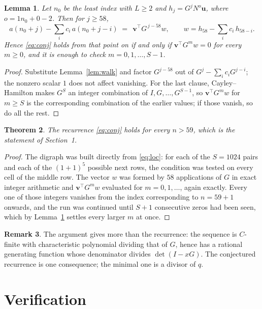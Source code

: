 \documentclass[11pt,a4paper]{article}
\theoremstyle{plain}
\newtheorem{theorem}{Theorem}
\newtheorem{lemma}[theorem]{Lemma}
\theoremstyle{definition}
\newtheorem{remark}[theorem]{Remark}
\begin{document}
\begin{lemma}\label{lem:crit}
Let $n_0$ be the least index with $L\ge2$ and $h_j=G^{j}N^{o}\mathbf{u}$, where
$o=1n_0+0-2$. Then for $j\ge58$,
\[
a(n_0+j)-\sum_i c_i\,a(n_0+j-i)\;=\;\,\mathbf{v}^{\!\top}G^{\,j-58}w,
\qquad w=h_{58}-\sum_i c_i\,h_{58-i} .
\]
Hence \eqref{eq:conj} holds from that point on if and only if
$\mathbf{v}^{\!\top}G^{m}w=0$ for every $m\ge0$, and it is enough to check
$m=0,1,\dots,S-1$.
\end{lemma}

\begin{proof}
Substitute Lemma~\ref{lem:walk} and factor $G^{j-58}$ out of
$G^{j}-\sum_ic_iG^{j-i}$; the nonzero scalar $1$ does not affect
vanishing. For the last clause, Cayley--Hamilton makes $G^{S}$ an integer combination of
$I,G,\dots,G^{S-1}$, so $\mathbf{v}^{\!\top}G^{m}w$ for $m\ge S$ is the corresponding
combination of the earlier values; if those vanish, so do all the rest.
\end{proof}

\begin{theorem}
The recurrence \eqref{eq:conj} holds for every $n>59$, which is the statement of
Section~1.
\end{theorem}

\begin{proof}
The digraph was built directly from \eqref{eq:loc}: for each of the $S=1024$ pairs and each
of the $(1+1)^{5}$ possible next rows, the condition was tested on every cell of
the middle row. The vector $w$ was formed by $58$ applications of $G$ in exact integer
arithmetic and $\mathbf{v}^{\!\top}G^{m}w$ evaluated for $m=0,1,\dots$, again exactly.
Every one of those integers vanishes from the index corresponding to $n=59+1$ onwards,
and the run was continued until $S+1$ consecutive zeros had been seen, which by
Lemma~\ref{lem:crit} settles every larger $m$ at once.
\end{proof}

\begin{remark}
The argument gives more than the recurrence: the sequence is $C$-finite with characteristic
polynomial dividing that of $G$, hence has a rational generating function whose denominator
divides $\det(I-xG)$. The conjectured recurrence is one consequence; the minimal one is a
divisor of $q$.
\end{remark}

\section{Verification}
\end{document}
